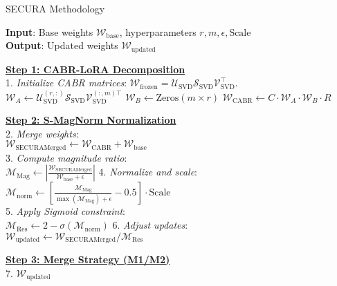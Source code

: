 \SetAlFnt{\small}

\begin{algorithm}[htbp]  %
\caption{SECURA Methodology}
\label{alg:secura}
\SetAlgoLined
\DontPrintSemicolon
\textbf{Input}: Base weights $\mathcal{W}_{\text{base}}$, hyperparameters $r, m, \epsilon, \text{Scale}$ \\
\textbf{Output}: Updated weights $\mathcal{W}_{\text{updated}}$

\underline{\textbf{Step 1: CABR-LoRA Decomposition}} \\
1. \textit{Initialize CABR matrices}: 
\quad $\mathcal{W}_{\text{frozen}} = \mathcal{U}_{\text{SVD}} \mathcal{S}_{\text{SVD}} \mathcal{V}_{\text{SVD}}^{\top}.$  
\quad $\mathcal{W}_A \gets \mathcal{U}_{\text{SVD}}^{(r,:)} \mathcal{S}_{\text{SVD}} \mathcal{V}_{\text{SVD}}^{(:,m) \top}$  
\quad $\mathcal{W}_B \gets \text{Zeros}(m \times r)$  
\quad $\mathcal{W}_{\text{CABR}} \gets C \cdot \mathcal{W}_A \cdot \mathcal{W}_B \cdot R$ 

\underline{\textbf{Step 2: S-MagNorm Normalization}} \\
2. \textit{Merge weights}: \\
\quad $\mathcal{W}_{\text{SECURAMerged}} \gets \mathcal{W}_{\text{CABR}} + \mathcal{W}_{\text{base}}$ \\
3. \textit{Compute magnitude ratio}: \\
\quad $\mathcal{M}_{\text{Mag}} \gets \left|\frac{\mathcal{W}_{\text{SECURAMerged}}}{\mathcal{W}_{\text{base}} + \epsilon}\right|$  
4. \textit{Normalize and scale}: \\
\quad $\mathcal{M}_{\text{norm}} \gets \left[\frac{\mathcal{M}_{\text{Mag}}}{\max(\mathcal{M}_{\text{Mag}}) + \epsilon} - 0.5\right] \cdot \text{Scale}$ \\
5. \textit{Apply Sigmoid constraint}: \\
\quad $\mathcal{M}_{\text{Res}} \gets 2 - \sigma(\mathcal{M}_{\text{norm}})$  
6. \textit{Adjust updates}: \\
\quad $\mathcal{W}_{\text{updated}} \gets \mathcal{W}_{\text{SECURAMerged}} / \mathcal{M}_{\text{Res}}$ 

\underline{\textbf{Step 3: Merge Strategy (M1/M2)}} \\
7. 
\Return $\mathcal{W}_{\text{updated}}$
\end{algorithm}
